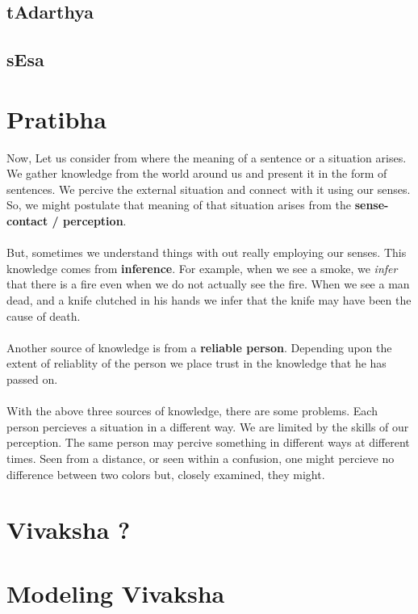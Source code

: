 \documentclass[a4paper,10pt]{article}
\begin{document}
  \subsection{tAdarthya}
  \subsection{sEsa}
\section{Pratibha}
Now, Let us consider from where the meaning of a sentence or a situation arises. 
We gather knowledge from the world around us and present it in the form of sentences.
We percive the external situation and connect with it using our senses. 
So, we might postulate that meaning of that situation arises from the \textbf{sense-contact / perception}.

\paragraph{} But, sometimes we understand things with out really employing our senses. 
This knowledge comes from \textbf{inference}.
For example, when we see a smoke, we \textit{infer} that there is a fire even when we do not actually see the fire. 
When we see a man dead, and a knife clutched in his hands we infer that the knife may have been the cause of death.

\paragraph{} Another source of knowledge is from a \textbf{reliable person}. 
Depending upon the extent of reliablity of the person we place trust in the knowledge that he has passed on.

\paragraph{} With the above three sources of knowledge, there are some problems. Each person percieves a situation in a different way. 
We are limited by the skills of our perception. The same person may percive something in different ways at different times. 
Seen from a distance, or seen within a confusion, one might percieve no difference between two colors but, closely examined, they might.


\newpage
\section{Vivaksha ?}
\newpage
\section{Modeling Vivaksha}
\end{document}
